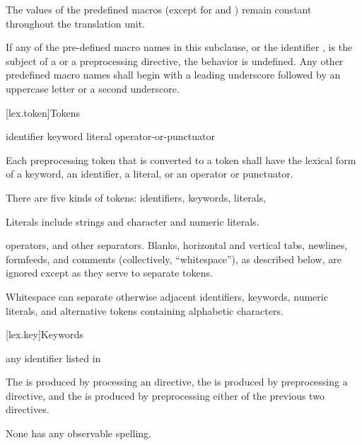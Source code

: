 \pnum
The values of the predefined macros
(except for
and
)
remain constant throughout the translation unit.

\pnum
If any of the pre-defined macro names in this subclause,
or the identifier
,
is the subject of a
or a
preprocessing directive,
the behavior is undefined.
Any other predefined macro names shall begin with a
leading underscore followed by an uppercase letter or a second
underscore.

[lex.token]{Tokens}

%
\begin{bnf}
\br
    identifier\br
    keyword\br
    literal\br
    operator-or-punctuator
\end{bnf}

\pnum
Each preprocessing token that is converted to a token
shall have the lexical form of a keyword, an identifier, a literal,
or an operator or punctuator.

\pnum
{}%
There are five kinds of tokens: identifiers, keywords, literals,%
\begin{footnote}
Literals include strings and character and numeric literals.
\end{footnote}
operators, and other separators.
%
Blanks, horizontal and vertical tabs, newlines, formfeeds, and comments
(collectively, ``whitespace''), as described below, are ignored except
as they serve to separate tokens.
\begin{note}
Whitespace can separate otherwise adjacent identifiers, keywords, numeric
literals, and alternative tokens containing alphabetic characters.
\end{note}

[lex.key]{Keywords}

\begin{bnf}
\br
    \textnormal{any identifier listed in }\br
    \br
    \br
\end{bnf}

\pnum
The  is produced
by processing an  directive,
the  is produced
by preprocessing a  directive, and
the  is produced
by preprocessing either of the previous two directives.
\begin{note}
None has any observable spelling.
\end{note}

